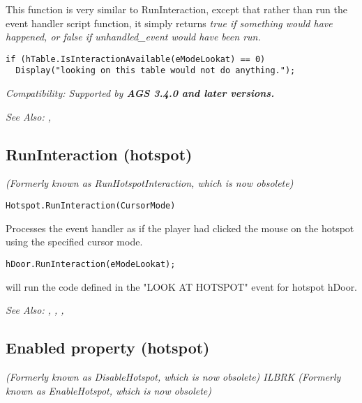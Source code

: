 This function is very similar to RunInteraction, except that rather than run the event
handler script function, it simply returns \it{true} if something would have happened,
or \it{false} if unhandled_event would have been run.

\begin{verbatim}
if (hTable.IsInteractionAvailable(eModeLookat) == 0)
  Display("looking on this table would not do anything.");
\end{verbatim}

\it{Compatibility:} Supported by \bf{AGS 3.4.0} and later versions.

\it{See Also:} ,


\subsection{RunInteraction (hotspot)}\label{Hotspot.RunInteraction}%

\it{(Formerly known as RunHotspotInteraction, which is now obsolete)}

\begin{verbatim}
Hotspot.RunInteraction(CursorMode)
\end{verbatim}
Processes the event handler as if the player had clicked the mouse
on the hotspot using the specified cursor mode.

\begin{verbatim}
hDoor.RunInteraction(eModeLookat);
\end{verbatim}
will run the code defined in the "LOOK AT HOTSPOT" event for hotspot hDoor.

\it{See Also:} ,
,
,


\subsection{Enabled property (hotspot)}\label{Hotspot.Enabled}%

\it{(Formerly known as DisableHotspot, which is now obsolete)} ILBRK
\it{(Formerly known as EnableHotspot, which is now obsolete)}

